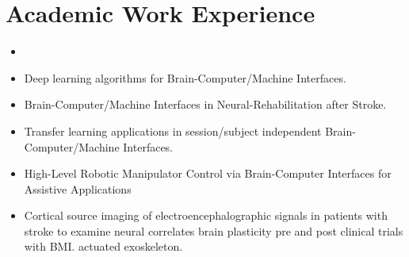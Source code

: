 \documentclass[10pt,letterpaper,sans]{moderncv}   %
\begin{document}
\section{Academic Work Experience}
{{\begin{itemize}%
\item[Research Focus:] 
\item Deep learning algorithms for Brain-Computer/Machine Interfaces. 
\item Brain-Computer/Machine Interfaces in Neural-Rehabilitation after Stroke. 
\item Transfer learning applications in session/subject independent Brain-Computer/Machine Interfaces. 
\item High-Level Robotic Manipulator Control via Brain-Computer Interfaces for Assistive Applications  
\end{itemize}
}}

{{\begin{itemize}                         
            \item Cortical source imaging of electroencephalographic signals in patients with stroke to examine neural correlates brain plasticity pre and post clinical trials with BMI. actuated exoskeleton.
        \end{itemize}
}} 
\end{document}
